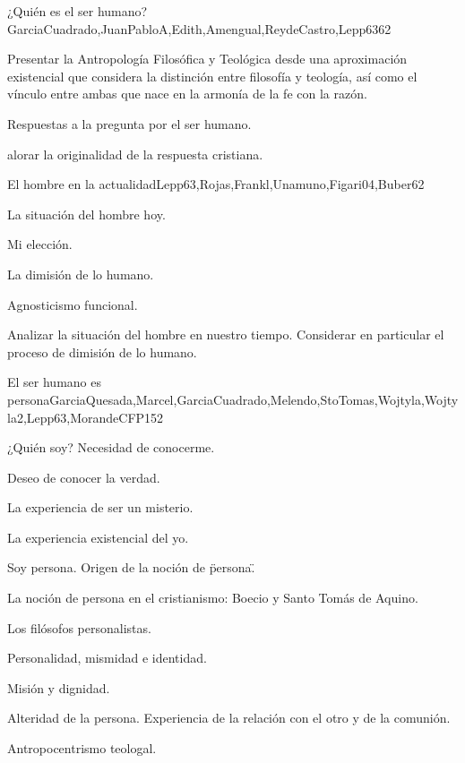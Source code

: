 \begin{syllabus}
\begin{unit}{¿Quién es el ser humano?}{GarciaCuadrado,JuanPabloA,Edith,Amengual,ReydeCastro,Lepp63}{6}{2}
\begin{learningoutcomes}
	\item Presentar la Antropología Filosófica y Teológica desde una aproximación existencial que considera la distinción entre filosofía y teología, así como el vínculo entre ambas que nace en la armonía de la fe con la razón.
	\item Respuestas a la pregunta por el ser humano.
	\item alorar la originalidad de la respuesta cristiana.
\end{learningoutcomes}
\end{unit}

\begin{unit}{El hombre en la actualidad}{Lepp63,Rojas,Frankl,Unamuno,Figari04,Buber}{6}{2}
\begin{topics}
 		\item La situación del hombre hoy.
 		\item Mi elección.
 		\item La dimisión de lo humano.
 		\item Agnosticismo funcional.
\end{topics}

\begin{learningoutcomes}
	\item Analizar la situación del hombre en nuestro tiempo. Considerar en particular el proceso de dimisión de lo humano. 
\end{learningoutcomes}
\end{unit}

\begin{unit}{El ser humano es persona}{GarciaQuesada,Marcel,GarciaCuadrado,Melendo,StoTomas,Wojtyla,Wojtyla2,Lepp63,MorandeCFP}{15}{2}
\begin{topics}
 		\item ¿Quién soy? Necesidad de conocerme.
 		\item Deseo de conocer la verdad.
 		\item La experiencia de ser un misterio.
 		\item La experiencia existencial del yo.
 		\item Soy persona. Origen de la noción de \"persona\".
 		\item La noción de persona en el cristianismo: Boecio y Santo Tomás de Aquino.
 		\item Los filósofos personalistas.
 		\item Personalidad, mismidad e identidad.
 		\item Misión y dignidad.
 		\item Alteridad de la persona. Experiencia de la relación con el otro y de la comunión.
 		\item Antropocentrismo teologal.
\end{topics}


\end{unit}
\end{syllabus}
